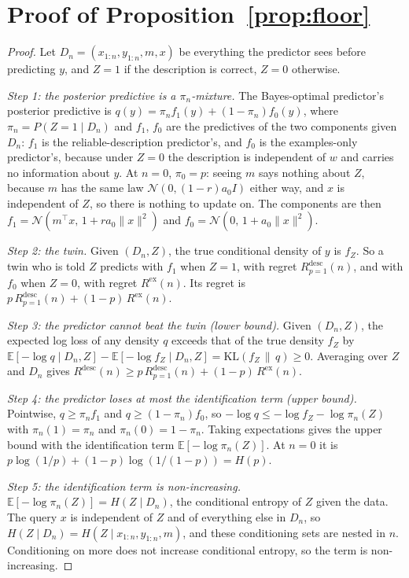 \documentclass[10pt]{article}
\newcommand{\E}{\mathbb{E}}
\begin{document}
\section{Proof of Proposition~\ref{prop:floor}}\label{app:floor}

\begin{proof}
Let $D_n = (x_{1:n}, y_{1:n}, m, x)$ be everything the predictor sees before predicting $y$, and $Z = 1$ if the description is correct, $Z = 0$ otherwise.

\emph{Step 1: the posterior predictive is a $\pi_n$-mixture.} The Bayes-optimal predictor's posterior predictive is $q(y) = \pi_n f_1(y) + (1 - \pi_n) f_0(y)$, where $\pi_n = P(Z = 1 \mid D_n)$ and $f_1$, $f_0$ are the predictives of the two components given $D_n$: $f_1$ is the reliable-description predictor's, and $f_0$ is the examples-only predictor's, because under $Z = 0$ the description is independent of $w$ and carries no information about $y$. At $n = 0$, $\pi_0 = p$: seeing $m$ says nothing about $Z$, because $m$ has the same law $\mathcal{N}(0, (1-r) a_0 I)$ either way, and $x$ is independent of $Z$, so there is nothing to update on. The components are then $f_1 = \mathcal{N}(m^\top x,\, 1 + r a_0\|x\|^2)$ and $f_0 = \mathcal{N}(0,\, 1 + a_0\|x\|^2)$.

\emph{Step 2: the twin.} Given $(D_n, Z)$, the true conditional density of $y$ is $f_Z$. So a twin who is told $Z$ predicts with $f_1$ when $Z = 1$, with regret $R^{\mathrm{desc}}_{p=1}(n)$, and with $f_0$ when $Z = 0$, with regret $R^{\mathrm{ex}}(n)$. Its regret is $p\,R^{\mathrm{desc}}_{p=1}(n) + (1-p)\,R^{\mathrm{ex}}(n)$.

\emph{Step 3: the predictor cannot beat the twin (lower bound).} Given $(D_n, Z)$, the expected log loss of any density $q$ exceeds that of the true density $f_Z$ by $\E[-\log q \mid D_n, Z] - \E[-\log f_Z \mid D_n, Z] = \mathrm{KL}(f_Z \,\|\, q) \ge 0$. Averaging over $Z$ and $D_n$ gives $R^{\mathrm{desc}}(n) \ge p\,R^{\mathrm{desc}}_{p=1}(n) + (1-p)\,R^{\mathrm{ex}}(n)$.

\emph{Step 4: the predictor loses at most the identification term (upper bound).} Pointwise, $q \ge \pi_n f_1$ and $q \ge (1 - \pi_n) f_0$, so $-\log q \le -\log f_Z - \log \pi_n(Z)$ with $\pi_n(1) = \pi_n$ and $\pi_n(0) = 1 - \pi_n$. Taking expectations gives the upper bound with the identification term $\E[-\log \pi_n(Z)]$. At $n = 0$ it is $p \log(1/p) + (1-p)\log(1/(1-p)) = H(p)$.

\emph{Step 5: the identification term is non-increasing.} $\E[-\log \pi_n(Z)] = H(Z \mid D_n)$, the conditional entropy of $Z$ given the data. The query $x$ is independent of $Z$ and of everything else in $D_n$, so $H(Z \mid D_n) = H(Z \mid x_{1:n}, y_{1:n}, m)$, and these conditioning sets are nested in $n$. Conditioning on more does not increase conditional entropy, so the term is non-increasing.


\end{proof}
\end{document}

